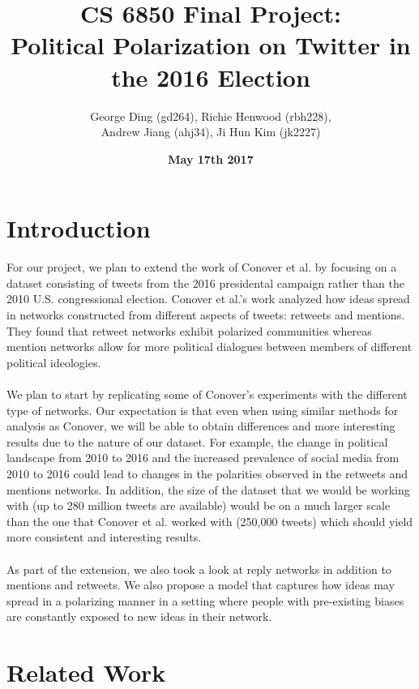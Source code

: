 \documentclass{article}
\title{\textbf{CS 6850 Final Project:}\\ Political Polarization on Twitter in the 2016 Election}
\author{George Ding (gd264), Richie Henwood (rbh228), \\Andrew Jiang (ahj34), Ji Hun Kim (jk2227)}
\date{\textbf{May 17th 2017}}
\begin{document}
\maketitle

\section{Introduction}

For our project, we plan to extend the work of Conover et al. \cite{conover} by focusing on a dataset consisting of tweets from the 2016 presidental campaign rather than the 2010 U.S. congressional election. Conover et al.'s work analyzed how ideas spread in networks constructed from different aspects of tweets: retweets and mentions. They found that retweet networks exhibit polarized communities whereas mention networks allow for more political dialogues between members of different political
ideologies. 
\\\\
We plan to start by replicating some of Conover’s experiments with the different type of networks. Our expectation is that even when using similar methods for analysis as Conover, we will be able to obtain differences and more interesting results due to the nature of our dataset. For example, the change in political landscape from 2010 to 2016 and the increased prevalence of social media from 2010 to 2016 could lead to changes in the polarities observed in the retweets and mentions networks. In addition, the size of the dataset that we would be working with (up to 280 million tweets are available) would be on a much larger scale than the one that Conover et al. worked with (250,000 tweets) which should yield more consistent and interesting results.
\\\\
As part of the extension, we also took a look at reply networks in addition to mentions and retweets. We also propose a model that captures how ideas may spread in a polarizing manner in a setting where people with pre-existing biases are constantly exposed to new ideas in their network. 

\section{Related Work} 
\end{document}
